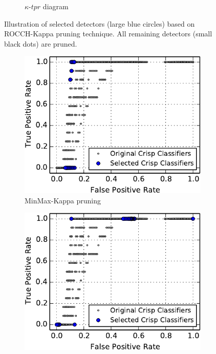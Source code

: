 \begin{figure}[tbh]
\begin{adjustbox}{minipage=\linewidth,scale=0.8}
\begin{subfigure}[b]{\columnwidth}
        \caption{$\kappa$-$tpr$ diagram}
        \label{fig:ROCCH-Kappa-tpr}
    \end{subfigure}
    \caption{Illustration of selected detectors (large blue circles) based on ROCCH-Kappa pruning technique. All remaining detectors (small black dots) are pruned.}
    \label{fig:ROCCH-Kappa-fpr-tpr}
    \end{adjustbox}
\end{figure}

\begin{figure}[tbh]
    \centering
    \begin{adjustbox}{minipage=\linewidth,scale=0.8}
    \begin{subfigure}[b]{\columnwidth}
        \centering
        \includegraphics[width=\linewidth]{figs/roc-MinMax-Kappa-selected-crop}
        \caption{MinMax-Kappa pruning}
        \label{fig:ROC-MinMax-Kappa}
    \vspace{0.7cm}
    \end{subfigure}
    \begin{subfigure}[b]{\columnwidth}
        \centering
        \includegraphics[width=\linewidth]{figs/roc-ROCCH-KAPPA-PairWise-selected-crop}

\end{subfigure}
\end{adjustbox}
\end{figure}
